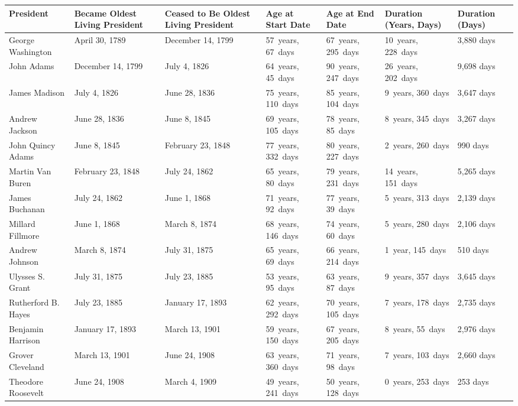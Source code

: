 \documentclass{article}
\begin{document}
\begin{tabular}{lllllll}
\toprule
President & Became Oldest Living President & Ceased to Be Oldest Living President & Age at Start Date & Age at End Date & Duration (Years, Days) & Duration (Days) \\
\midrule
George Washington & April 30, 1789 & December 14, 1799 & 57 years, 67 days & 67 years, 295 days & 10 years, 228 days & 3,880 days \\
John Adams & December 14, 1799 & July 4, 1826 & 64 years, 45 days & 90 years, 247 days & 26 years, 202 days & 9,698 days \\
James Madison & July 4, 1826 & June 28, 1836 & 75 years, 110 days & 85 years, 104 days & 9 years, 360 days & 3,647 days \\
Andrew Jackson & June 28, 1836 & June 8, 1845 & 69 years, 105 days & 78 years, 85 days & 8 years, 345 days & 3,267 days \\
John Quincy Adams & June 8, 1845 & February 23, 1848 & 77 years, 332 days & 80 years, 227 days & 2 years, 260 days & 990 days \\
Martin Van Buren & February 23, 1848 & July 24, 1862 & 65 years, 80 days & 79 years, 231 days & 14 years, 151 days & 5,265 days \\
James Buchanan & July 24, 1862 & June 1, 1868 & 71 years, 92 days & 77 years, 39 days & 5 years, 313 days & 2,139 days \\
Millard Fillmore & June 1, 1868 & March 8, 1874 & 68 years, 146 days & 74 years, 60 days & 5 years, 280 days & 2,106 days \\
Andrew Johnson & March 8, 1874 & July 31, 1875 & 65 years, 69 days & 66 years, 214 days & 1 year, 145 days & 510 days \\
Ulysses S. Grant & July 31, 1875 & July 23, 1885 & 53 years, 95 days & 63 years, 87 days & 9 years, 357 days & 3,645 days \\
Rutherford B. Hayes & July 23, 1885 & January 17, 1893 & 62 years, 292 days & 70 years, 105 days & 7 years, 178 days & 2,735 days \\
Benjamin Harrison & January 17, 1893 & March 13, 1901 & 59 years, 150 days & 67 years, 205 days & 8 years, 55 days & 2,976 days \\
Grover Cleveland & March 13, 1901 & June 24, 1908 & 63 years, 360 days & 71 years, 98 days & 7 years, 103 days & 2,660 days \\
Theodore Roosevelt & June 24, 1908 & March 4, 1909 & 49 years, 241 days & 50 years, 128 days & 0 years, 253 days & 253 days \\

\end{tabular}
\end{document}
